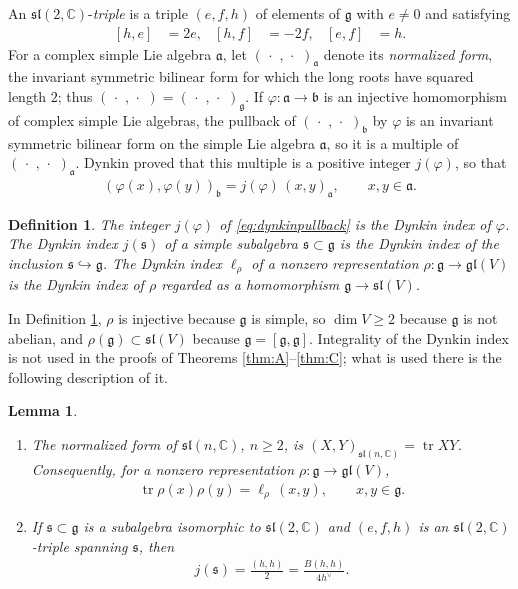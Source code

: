 \documentclass [leqno, 10pt]{amsart}
\newtheorem{lemma}[theorem]{Lemma}%
\newtheorem{definition}[theorem]{Definition}%
\theoremstyle{definition}
\numberwithin{equation}{section}
\newcommand{\dum}{\,\cdot\,\,}
\newcommand{\gl}{\mathfrak{gl}}
\newcommand{\sll}{\mathfrak{sl}}
\newcommand{\g}{\mathfrak{g}}
\newcommand{\com}{\mathbb C}
\newcommand{\tr}{\operatorname{tr}}
\newcommand{\hv}{h^\vee}
\newcommand{\subs}{\mathfrak{s}}
\begin{document}
An $\sll(2,\com)$-\emph{triple} is a triple $(e,f,h)$ of elements of $\g$ with $e \neq 0$ and satisfying
\begin{align}\label{eq:sl2triple}
[h,e]&=2e, & [h,f]&=-2f, & [e,f]&=h.
\end{align}
For a complex simple Lie algebra $\mathfrak{a}$, let $(\dum, \dum)_{\mathfrak{a}}$ denote its \emph{normalized form}, the invariant symmetric bilinear form for which the long roots have squared length $2$; thus $(\dum, \dum) = (\dum, \dum)_{\g}$. If $\varphi:\mathfrak{a} \to \mathfrak{b}$ is an injective homomorphism of complex simple Lie algebras, the pullback of $(\dum, \dum)_{\mathfrak{b}}$ by $\varphi$ is an invariant symmetric bilinear form on the simple Lie algebra $\mathfrak{a}$, so it is a multiple of $(\dum, \dum)_{\mathfrak{a}}$. Dynkin \cite[Theorem~2.2]{Dynkin-semisimplesubalgebras} proved that this multiple is a positive integer $j(\varphi)$, so that
\begin{align}\label{eq:dynkinpullback}
(\varphi(x), \varphi(y))_{\mathfrak{b}} = j(\varphi)\,(x, y)_{\mathfrak{a}}, \qquad x, y \in \mathfrak{a}.
\end{align}

\begin{definition}\label{def:dynkin}
The integer $j(\varphi)$ of \eqref{eq:dynkinpullback} is the \emph{Dynkin index} of $\varphi$. The Dynkin index $j(\subs)$ of a simple subalgebra $\subs \subset \g$ is the Dynkin index of the inclusion $\subs \hookrightarrow \g$. The Dynkin index $\ell_{\rho}$ of a nonzero representation $\rho:\g \to \gl(V)$ is the Dynkin index of $\rho$ regarded as a homomorphism $\g \to \sll(V)$.
\end{definition}

In Definition \ref{def:dynkin}, $\rho$ is injective because $\g$ is simple, so $\dim V \geq 2$ because $\g$ is not abelian, and $\rho(\g) \subset \sll(V)$ because $\g = [\g, \g]$. Integrality of the Dynkin index is not used in the proofs of Theorems \ref{thm:A}--\ref{thm:C}; what is used there is the following description of it.

\vfill
\begin{lemma}\label{lem:dynkinformula}
\leavevmode\noindent
\begin{enumerate}[label=(\arabic*), ref=(\arabic*)]
\item\label{dynkinformula1} The normalized form of $\sll(n, \com)$, $n \geq 2$, is $(X, Y)_{\sll(n, \com)} = \tr XY$. Consequently, for a nonzero representation $\rho:\g \to \gl(V)$,
\begin{align}\label{eq:repindex}
\tr \rho(x)\rho(y) = \ell_{\rho}\,(x, y), \qquad x, y \in \g.
\end{align}
\item\label{dynkinformula2} If $\subs \subset \g$ is a subalgebra isomorphic to $\sll(2, \com)$ and $(e, f, h)$ is an $\sll(2, \com)$-triple spanning $\subs$, then
\begin{align}\label{eq:dynkinindex}
j(\subs) = \frac{(h, h)}{2} = \frac{B(h, h)}{4\hv}.
\end{align}
\end{enumerate}
\end{lemma}
\end{document}
